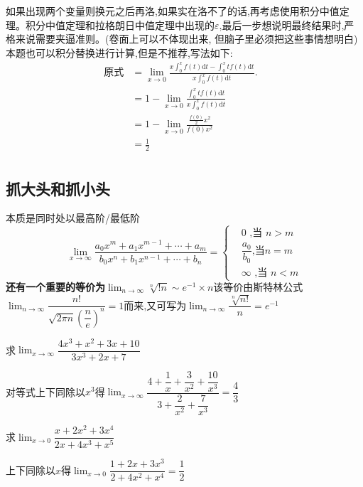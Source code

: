\documentclass[10pt, a4paper, oneside, UTF8]{ctexbook}
\begin{document}
\begin{sloppypar}
\begin{note}
        如果出现两个变量则换元之后再洛,如果实在洛不了的话,再考虑使用积分中值定理。积分中值定理和拉格朗日中值定理中出现的$\varepsilon$,最后一步想说明最终结果时,严格来说需要夹逼准则。(卷面上可以不体现出来, 但脑子里必须把这些事情想明白)\\
        本题也可以积分替换进行计算,但是不推荐,写法如下:
        \begin{align*}
             \text{原式} & = \lim_{x\to0}\frac{x\int_{0}^{x}f(t)\mathrm{d}t-\int_{0}^{x}tf\left(t\right)\mathrm{d}t}{x\!\int_{0}^{x}f(t)\mathrm{d}t}. & \\
             & = 1-\lim_{x\to0}\frac{\int_{0}^{x}tf\left(t\right)\mathrm{d}t}{x\int_{0}^{x}f\left(t\right)\mathrm{d}t} & \\
             & =1-\lim_{x\to0}\frac{\frac{f\left(0\right)}{2}x^{2}}{f\left(0\right)x^{2}} & \\
             & =\frac{1}{2} &\\
        \end{align*}
    \end{note}
    \subsection{抓大头和抓小头}
    本质是同时处以最高阶/最低阶
    $$
    \lim_{x\to\infty}\dfrac{a_0x^m+a_1x^{m-1}+\cdots+a_m}{b_0x^n+b_1x^{n-1}+\cdots+b_n}=\left.\left\{\begin{aligned}&0\text{ ,当 }n>m\\&\dfrac{a_0}{b_0}\text{,当}n=m\\&\infty\text{ ,当 }n<m\end{aligned}\right.\right.
    $$
    \textbf{还有一个重要的等价为$\lim_{n\to \infty}\sqrt[n]{!n}\sim e^{-1}\times n$}该等价由斯特林公式$\lim_{n\to\infty}\dfrac{n!}{\sqrt{2\pi n}\left(\dfrac ne\right)^n}=1$而来,又可写为\textbf{$\lim_{n\rightarrow\infty}\dfrac{\sqrt[n]{n!}}{n}=e^{-1}$}
    \begin{problem}
        求$\lim_{x\to \infty}\dfrac{4x^3+x^2+3x+10}{3x^3+2x+7}$
    \end{problem}
    \begin{solution}
        对等式上下同除以$x^3$得$\lim_{x \to \infty}\dfrac{4+\dfrac1x+\dfrac3{x^2}+\dfrac{10}{x^3}}{3+\dfrac2{x^2}+\dfrac7{x^3}}=\dfrac{4}{3}$
    \end{solution}
    \begin{problem}
        求$\lim_{x\to 0}\dfrac{x+2x^{2}+3x^{4}}{2x+4x^{3}+x^{5}}$
    \end{problem}
    \begin{solution}
        上下同除以$x$得$\lim_{x\to 0}\dfrac{1+2x+3x^{3}}{2+4x^{2}+x^{4}}=\dfrac{1}{2}$
    \end{solution}

\end{sloppypar}
\end{document}

